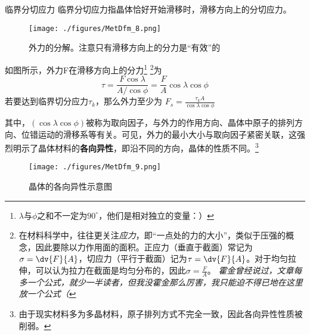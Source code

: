 \begin{definition}{临界分切应力}
临界分切应力指晶体恰好开始滑移时，滑移方向上的分切应力。
\end{definition}

\begin{figure}[ht]
\centering
\texttt{[image: ./figures/MetDfm\_8.png]}
\caption{外力的分解。注意只有滑移方向上的分力是“有效”的} \label{MetDfm_fig8}
\end{figure}

如图所示，外力F在滑移方向上的分力\footnote{$\lambda$与$\phi$之和不一定为$90^\circ$，他们是相对独立的变量：）} \footnote{在材料科学中，往往更关注\textsl{应力}，即“一点处的力的大小”，类似于压强的概念，因此要除以力作用面的面积。正应力（垂直于截面）常记为$\sigma=\dv{F}{A}$，切应力（平行于截面）记为$\tau=\dv{F}{A}$。对于均匀拉伸，可以认为拉力在截面是均匀分布的，因此$\sigma=\frac{F}{A}$。 \textsl{霍金曾经说过，文章每多一个公式，就少一半读者，但我没霍金那么厉害，我只能迫不得已地在这里放一个公式（}}为
\begin{equation}
\tau=\frac{F \cos \lambda}{A/{\cos \phi}}=\frac{F}{A}{\cos \lambda}{\cos \phi}
\end{equation}
若要达到临界切分应力$\tau_k$，那么外力至少为 $F_s=\frac{\tau_k A}{\cos \lambda \cos \phi} $ 

其中，$(\cos \lambda \cos \phi)$被称为取向因子，与外力的作用方向、晶体中原子的排列方向、位错运动的滑移系等有关。可见，外力的最小大小与取向因子紧密关联，这强烈明示了晶体材料的\textbf{各向异性}，即沿不同的方向，晶体的性质不同。\footnote{由于现实材料多为多晶材料，原子排列方式不完全一致，因此各向异性性质被削弱。}

\begin{figure}[ht]
\centering
\texttt{[image: ./figures/MetDfm\_9.png]}
\caption{晶体的各向异性示意图} \label{MetDfm_fig9}
\end{figure}
